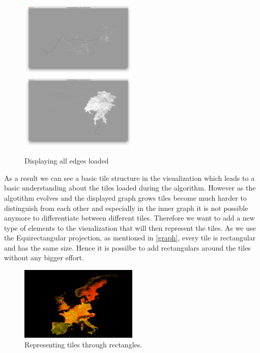 \documentclass
[
	paper = a4,
    pagesize,
	12 pt,
	oneside,                       %
    open = right,
	DIV = calc,
	BCOR = 0 mm,                   %
	bibtotoc
]
{scrbook}
\begin{document}
\begin{figure}[H]
	\includegraphics[width=0.5\textwidth]{Images/vis-edges-only-small.png}
	\includegraphics[width=0.5\textwidth]{Images/vis-edges-only-big.png}
\caption[]{Displaying all edges loaded}
\label{fig:basic_tiles}
\end{figure}


As a result we can see a basic tile structure in the visualization which leads to a basic understanding about the tiles loaded during the algorithm.
However as the algotithm evolves and the displayed graph grows tiles become much harder to distinguish from each other and especially in the inner graph it is not possible anymore to differentiate between different tiles.
Therefore we want to add a new type of elements to the visualization that will then represent the tiles.
As we use the Equirectangular projection, as mentioned in \cref{graph}, every tile is rectangular and has the same size.
Hence it is possilbe to add rectangulars around the tiles without any bigger effort.

\begin{figure}[H]
	\includegraphics[width=0.5\textwidth]{Images/placeholder.png}
\caption[]{Representing tiles through rectangles.}
\label{fig:rectangle_tiles}
\end{figure}
\end{document}
